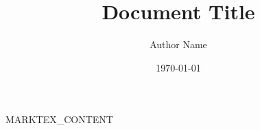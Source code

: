 \documentclass{article}
\title{Document Title}
\author{Author Name}
\date{\today}
\theoremstyle{plain}
\theoremstyle{definition}
\theoremstyle{remark}
\begin{document}
\maketitle

\tableofcontents

{{MARKTEX_CONTENT}}
\end{document}
